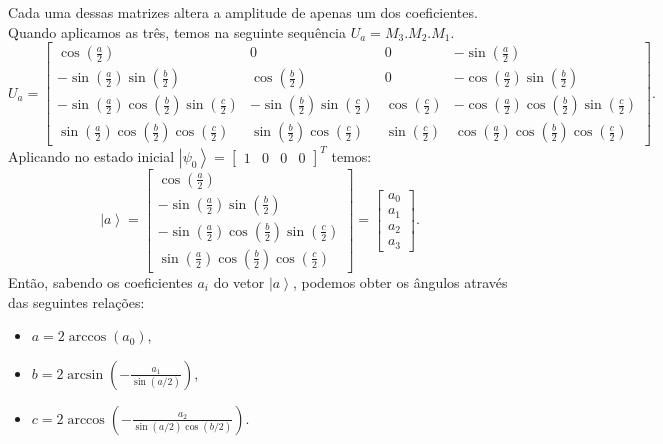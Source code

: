 Cada uma dessas matrizes altera a amplitude de apenas um dos coeficientes. Quando aplicamos as três, temos na seguinte sequência $U_a=M_3.M_2.M_1.$
\begin{equation}
U_a=\left[\begin{array}{cccc}
\cos\left(\frac{a}{2}\right) & 0 & 0 & -\sin\left(\frac{a}{2}\right)\\
-\sin\left(\frac{a}{2}\right)\sin\left(\frac{b}{2}\right) & \cos\left(\frac{b}{2}\right) & 0 & -\cos\left(\frac{a}{2}\right)\sin\left(\frac{b}{2}\right)\\
-\sin\left(\frac{a}{2}\right)\cos\left(\frac{b}{2}\right)\sin\left(\frac{c}{2}\right) & -\sin\left(\frac{b}{2}\right)\sin\left(\frac{c}{2}\right) & \cos\left(\frac{c}{2}\right) & -\cos\left(\frac{a}{2}\right)\cos\left(\frac{b}{2}\right)\sin\left(\frac{c}{2}\right)\\
\sin\left(\frac{a}{2}\right)\cos\left(\frac{b}{2}\right)\cos\left(\frac{c}{2}\right) & \sin\left(\frac{b}{2}\right)\cos\left(\frac{c}{2}\right) & \sin\left(\frac{c}{2}\right) & \cos\left(\frac{a}{2}\right)\cos\left(\frac{b}{2}\right)\cos\left(\frac{c}{2}\right)
\end{array}\right]
\label{matrao}
. \end{equation}
Aplicando no estado inicial $\left|\psi_{0}\right\rangle =\left[\begin{array}{cccc}
1 & 0 & 0 & 0\end{array}\right]^{T}$ temos:
\begin{equation}
\left|a\right\rangle =\left[\begin{array}{c}
\cos\left(\frac{a}{2}\right)\\
-\sin\left(\frac{a}{2}\right)\sin\left(\frac{b}{2}\right)\\
-\sin\left(\frac{a}{2}\right)\cos\left(\frac{b}{2}\right)\sin\left(\frac{c}{2}\right)\\
\sin\left(\frac{a}{2}\right)\cos\left(\frac{b}{2}\right)\cos\left(\frac{c}{2}\right)
\end{array}\right]=\left[\begin{array}{c}
a_{0}\\
a_{1}\\
a_{2}\\
a_{3}
\end{array}\right]
. \end{equation}Então, sabendo os coeficientes $a_i$ do vetor $\left|a\right\rangle $,  podemos obter os ângulos através das seguintes relações:
\begin{itemize}
\item $a=2\arccos\left(a_{0}\right)$,
\item $b=2\arcsin\left(-\frac{a_{1}}{\sin\left(a/2\right)}\right)$,
\item $c=2\arccos\left(-\frac{a_{2}}{\sin\left(a/2\right)\cos\left(b/2\right)}\right)$.
\end{itemize}
